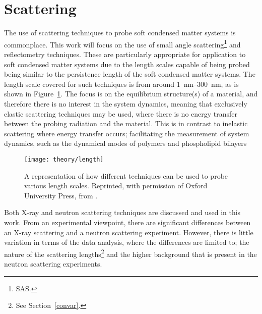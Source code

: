 \section{Scattering}
\label{sec:scattering}
The use of scattering techniques to probe soft condensed matter systems is commonplace.
This work will focus on the use of small angle scattering\footnote{SAS.} and reflectometry techniques.
These are particularly appropriate for application to soft condensed matter systems due to the length scales capable of being probed being similar to the persistence length of the soft condensed matter systems.
The length scale covered for such techniques is from around \SIrange{1}{300}{\nano\metre}, as is shown in Figure~\ref{fig:lengths}.
The focus is on the equilibrium structure(s) of a material, and therefore there is no interest in the system dynamics, meaning that exclusively elastic scattering techniques may be used, where there is no energy transfer between the probing radiation and the material.
This is in contrast to inelastic scattering where energy transfer occurs; facilitating the measurement of system dynamics, such as the dynamical modes of polymers and phospholipid bilayers
%
\begin{figure}[t]
    \forceversofloat
    \centering
    \texttt{[image: theory/length]}
    \caption{A representation of how different techniques can be used to probe various length scales. Reprinted, with permission of Oxford University Press, from \cite{sivia_elementary_2011}.}
    \label{fig:lengths}
\end{figure}
%

Both X-ray and neutron scattering techniques are discussed and used in this work.
From an experimental viewpoint, there are significant differences between an X-ray scattering and a neutron scattering experiment.
However, there is little variation in terms of the data analysis, where the differences are limited to; the nature of the scattering lengths\footnote{See Section~\ref{convar}.} and the higher background that is present in the neutron scattering experiments.

